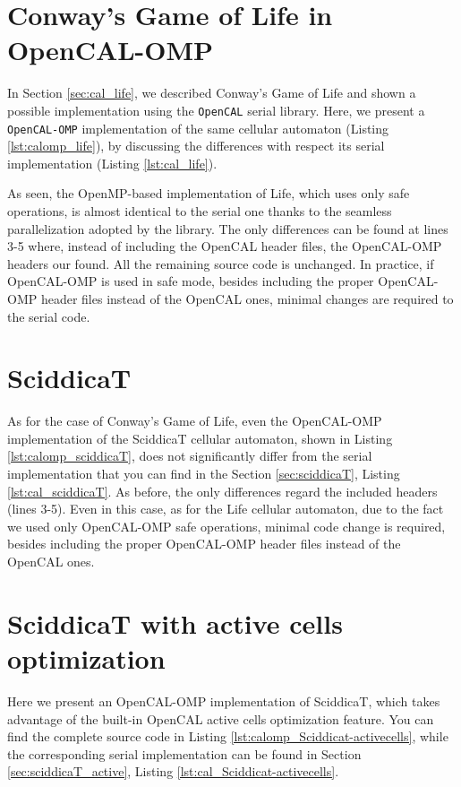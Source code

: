 \section{Conway's Game of Life in OpenCAL-OMP}

In Section \ref{sec:cal_life}, we described Conway's Game of Life and
shown a possible implementation using the \verb'OpenCAL' serial
library. Here, we present a \verb'OpenCAL-OMP' implementation of the
same cellular automaton (Listing \ref{lst:calomp_life}), by discussing
the differences with respect its serial implementation (Listing
\ref{lst:cal_life}).



As seen, the OpenMP-based implementation of Life, which uses
only safe operations, is almost identical to the serial one thanks to
the seamless parallelization adopted by the library.  The only
differences can be found at lines 3-5 where, instead of including the
OpenCAL header files, the OpenCAL-OMP headers our found. All the
remaining source code is unchanged. In practice, if 
OpenCAL-OMP is used in safe mode, besides including the proper OpenCAL-OMP
header files instead of the OpenCAL ones, minimal changes are required
to the serial code.


\section{SciddicaT}

As for the case of Conway's Game of Life, even the OpenCAL-OMP
implementation of the SciddicaT cellular automaton, shown in Listing
\ref{lst:calomp_sciddicaT}, does not significantly differ from the
serial implementation that you can find in the Section
\ref{sec:sciddicaT}, Listing \ref{lst:cal_sciddicaT}. As before, the
only differences regard the included headers (lines 3-5). Even in this
case, as for the Life cellular automaton, due to the fact we used only
OpenCAL-OMP safe operations, minimal code change is required, besides
including the proper OpenCAL-OMP header files instead of the OpenCAL
ones.



\section{SciddicaT with active cells optimization}
Here we present an OpenCAL-OMP implementation of SciddicaT, which takes
advantage of the built-in OpenCAL active cells optimization feature. You can
find the complete source code in Listing
\ref{lst:calomp_Sciddicat-activecells}, while the corresponding serial
implementation can be found in Section
\ref{sec:sciddicaT_active}, Listing
\ref{lst:cal_Sciddicat-activecells}.

